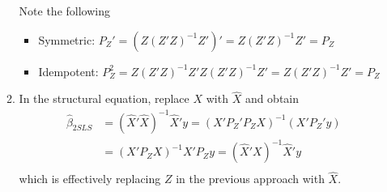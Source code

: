 \begin{itemize}
\begin{enumerate}
\begin{mdframed}[backgroundcolor=green!5]
\begin{property} Note the following 
\begin{itemize} 
\item Symmetric: $P_Z'=(Z(Z'Z)^{-1}Z')'=Z(Z'Z)^{-1}Z'=P_Z$
\item Idempotent: $P_Z^2=Z(Z'Z)^{-1}Z'Z(Z'Z)^{-1}Z'=Z(Z'Z)^{-1}Z'=P_Z$
\end{itemize}
\end{property}
\end{mdframed}
\item In the structural equation, replace $X$ with $\widehat{X}$ and obtain
\[
\begin{aligned}
\hat{\beta}_{2SLS}&=(\widehat{X}'\widehat{X})^{-1}\widehat{X}'y=(X'P_Z'P_ZX)^{-1}(X'P_Z'y)\\
&=(X'P_ZX)^{-1}X'P_Zy =(\widehat{X}'X)^{-1}\widehat{X}'y\\
\end{aligned}
\]
which is effectively replacing $Z$ in the previous approach with $\widehat{X}$. 
\end{enumerate}
\end{itemize}
